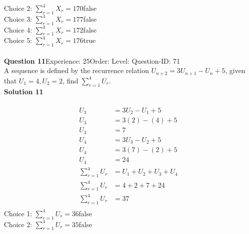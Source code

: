 \documentclass{article}
\begin{document}
Choice 2: \hspace{20pt}$\displaystyle\sum_{r=1}^{4} X_r=170$\hspace{20pt}false\\
Choice 3: \hspace{20pt}$\displaystyle\sum_{r=1}^{4} X_r=177$\hspace{20pt}false\\
Choice 4: \hspace{20pt}$\displaystyle\sum_{r=1}^{4} X_r=172$\hspace{20pt}false\\
Choice 5: \hspace{20pt}$\displaystyle\sum_{r=1}^{4} X_r=176$\hspace{20pt}true\\
\\[4pt]
\noindent\textbf{Question 11}\hspace{20pt}Experience: 25\hspace{20pt}Order: \hspace{20pt}Level: \hspace{20pt}Question-ID: 71\\[2pt]
A sequence is defined by the recurrence relation $U_{n+2}=3U_{n+1}-U_n+5$, given that  $U_1 =4,U_2=2$, find $\displaystyle\sum_{r=1}^{4} U_r$.\\[4pt]
\noindent\textbf{Solution 11}\\[2pt]
\\[-35pt]\begin{align*}
U_3&=3U_2-U_1+5\\[2pt]
U_3&=3(2)-(4)+5\\[2pt]
U_3&=7\\[12pt]
U_4&=3U_3-U_2+5\\[2pt]
U_4&=3(7)-(2)+5\\[2pt]
U_4&=24\\[12pt]
\displaystyle\sum_{r=1}^{4} U_r&=U_1+U_2+U_3+U_4\\[2pt]
\displaystyle\sum_{r=1}^{4} U_r&=4+2+7+24\\[2pt]
\displaystyle\sum_{r=1}^{4} U_r&=37\\[2pt]
\end{align*}
Choice 1: \hspace{20pt}$\displaystyle\sum_{r=1}^{4} U_r=36$\hspace{20pt}false\\
Choice 2: \hspace{20pt}$\displaystyle\sum_{r=1}^{4} U_r=35$\hspace{20pt}false\\
\end{document}

